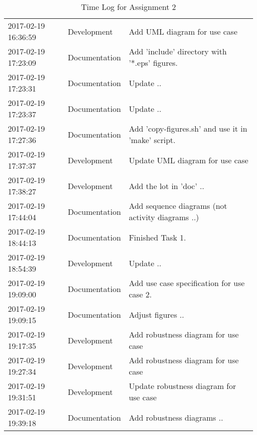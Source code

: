 \begin{table}[]
\begin{tabular}{@{}l|l|l}
    2017-02-19 16:36:59 & Development   & Add UML diagram for use case #2 ..                 \\
    2017-02-19 17:23:09 & Documentation & Add 'include' directory with '*.eps' figures.      \\
    2017-02-19 17:23:31 & Documentation & Update ..                                          \\
    2017-02-19 17:23:37 & Documentation & Update ..                                          \\
    2017-02-19 17:27:36 & Documentation & Add 'copy-figures.sh' and use it in 'make' script. \\
    2017-02-19 17:37:37 & Development   & Update UML diagram for use case #2.                \\
    2017-02-19 17:38:27 & Development   & Add the lot in 'doc' ..                            \\
    2017-02-19 17:44:04 & Documentation & Add sequence diagrams (not activity diagrams ..)   \\
    2017-02-19 18:44:13 & Documentation & Finished Task 1.                                   \\
    2017-02-19 18:54:39 & Development   & Update ..                                          \\
    2017-02-19 19:09:00 & Documentation & Add use case specification for use case 2.         \\
    2017-02-19 19:09:15 & Documentation & Adjust figures ..                                  \\
    2017-02-19 19:17:35 & Development   & Add robustness diagram for use case #1.            \\
    2017-02-19 19:27:34 & Development   & Add robustness diagram for use case #2.            \\
    2017-02-19 19:31:51 & Development   & Update robustness diagram for use case #1.         \\
    2017-02-19 19:39:18 & Documentation & Add robustness diagrams ..                         \\ \bottomrule
    

  \end{tabular}
  \caption{Time Log for Assignment 2}
  \label{table-timelog}
\end{table}

